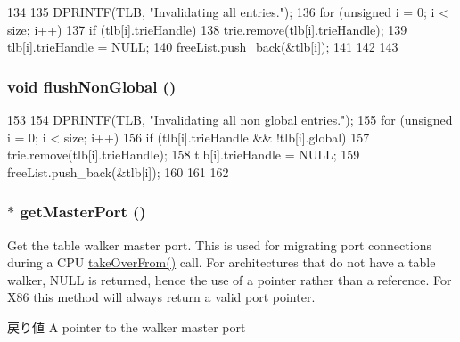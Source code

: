 \begin{DoxyCode}
134 {
135     DPRINTF(TLB, "Invalidating all entries.\n");
136     for (unsigned i = 0; i < size; i++) {
137         if (tlb[i].trieHandle) {
138             trie.remove(tlb[i].trieHandle);
139             tlb[i].trieHandle = NULL;
140             freeList.push_back(&tlb[i]);
141         }
142     }
143 }
\end{DoxyCode}
\hypertarget{classX86ISA_1_1TLB_a31bf0dd34724a05bf42926ee68e516ef}{
\subsubsection[{flushNonGlobal}]{\setlength{\rightskip}{0pt plus 5cm}void flushNonGlobal ()}}
\label{classX86ISA_1_1TLB_a31bf0dd34724a05bf42926ee68e516ef}



\begin{DoxyCode}
153 {
154     DPRINTF(TLB, "Invalidating all non global entries.\n");
155     for (unsigned i = 0; i < size; i++) {
156         if (tlb[i].trieHandle && !tlb[i].global) {
157             trie.remove(tlb[i].trieHandle);
158             tlb[i].trieHandle = NULL;
159             freeList.push_back(&tlb[i]);
160         }
161     }
162 }
\end{DoxyCode}
\hypertarget{classX86ISA_1_1TLB_a2ea87b216b1f58953a679590672be258}{
\subsubsection[{getMasterPort}]{ $\ast$ getMasterPort ()}}
\label{classX86ISA_1_1TLB_a2ea87b216b1f58953a679590672be258}
Get the table walker master port. This is used for migrating port connections during a CPU \hyperlink{classX86ISA_1_1TLB_a15b6c15c1be2ca4de3e65772a02aa29f}{takeOverFrom()} call. For architectures that do not have a table walker, NULL is returned, hence the use of a pointer rather than a reference. For X86 this method will always return a valid port pointer.

\begin{DoxyReturn}{戻り値}
A pointer to the walker master port 
\end{DoxyReturn}


